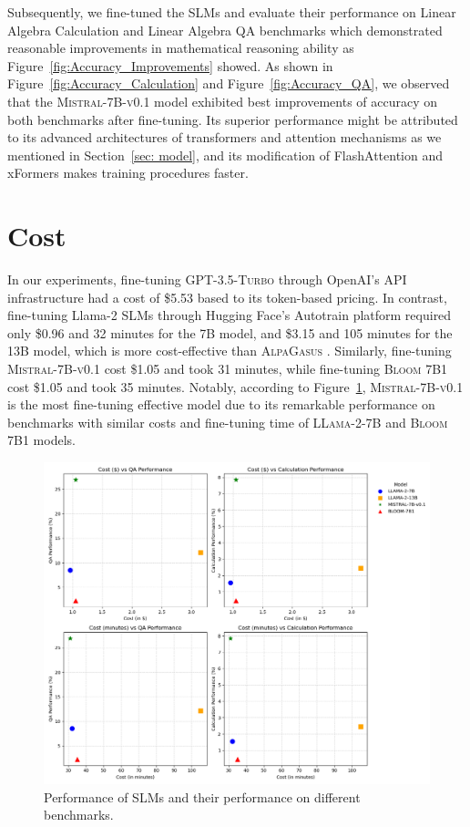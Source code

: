 \documentclass[10pt]{article}
\begin{document}
Subsequently, we fine-tuned the SLMs and evaluate their performance on Linear Algebra Calculation and Linear Algebra QA benchmarks which demonstrated reasonable improvements in mathematical reasoning ability as Figure~\ref{fig:Accuracy_Improvements} showed. As shown in Figure~\ref{fig:Accuracy_Calculation} and Figure~\ref{fig:Accuracy_QA}, we observed that the \textsc{Mistral-7B-v0.1} \cite{jiang2023mistral7b} model exhibited best improvements of accuracy on both benchmarks after fine-tuning. Its superior performance might be attributed to its advanced architectures of transformers and attention mechanisms as we mentioned in Section~\ref{sec: model}, and its modification of FlashAttention \cite{Dao2022FlashAttentionFA} and xFormers \cite{xformers} makes training procedures faster. 

\section{Cost}
In our experiments, fine-tuning \textsc{GPT-3.5-Turbo} through OpenAI's API infrastructure had a cost of \$5.53 based to its token-based pricing. In contrast, fine-tuning Llama-2 SLMs through Hugging Face's Autotrain platform required only \$0.96 and 32 minutes for the 7B model, and \$3.15 and 105 minutes for the 13B model, which is more cost-effective than \textsc{AlpaGasus} \cite{Chen2023AlpaGasusTA}. Similarly, fine-tuning \textsc{Mistral-7B-v0.1} cost \$1.05 and took 31 minutes, while fine-tuning \textsc{Bloom 7B1} cost \$1.05 and took 35 minutes. Notably, according to Figure~\ref{fig:performance},  \textsc{Mistral-7B-v0.1} is the most fine-tuning effective model due to its remarkable performance on benchmarks with similar costs and fine-tuning time of \textsc{LLama-2-7B} and \textsc{Bloom 7B1} models. 
\begin{figure}[h]
    \centering
    \includegraphics[width=0.8\linewidth]{Figures/Cost_vs_Performance.png}
    \caption{Performance of SLMs and their performance on different benchmarks.}
    \label{fig:performance}
\end{figure}
\end{document}
